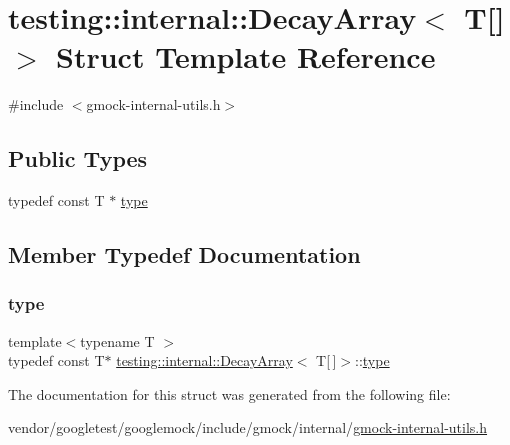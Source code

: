 \hypertarget{structtesting_1_1internal_1_1_decay_array_3_01_t[]_4}{}\section{testing\+:\+:internal\+:\+:Decay\+Array$<$ T\mbox{[}\mbox{]}$>$ Struct Template Reference}
\label{structtesting_1_1internal_1_1_decay_array_3_01_t[]_4}


{\ttfamily \#include $<$gmock-\/internal-\/utils.\+h$>$}

\subsection*{Public Types}
\begin{DoxyCompactItemize}
\item 
typedef const T $\ast$ \hyperlink{structtesting_1_1internal_1_1_decay_array_3_01_t[]_4_a1820b673d104b3a985faaef8db5d77d2}{type}
\end{DoxyCompactItemize}


\subsection{Member Typedef Documentation}
\mbox{\label{structtesting_1_1internal_1_1_decay_array_3_01_t[]_4_a1820b673d104b3a985faaef8db5d77d2}} 
\subsubsection{\texorpdfstring{type}{type}}
{\footnotesize\ttfamily template$<$typename T $>$ \\
typedef const T$\ast$ \hyperlink{structtesting_1_1internal_1_1_decay_array}{testing\+::internal\+::\+Decay\+Array}$<$ T\mbox{[}$\,$\mbox{]}$>$\+::\hyperlink{structtesting_1_1internal_1_1_decay_array_3_01_t[]_4_a1820b673d104b3a985faaef8db5d77d2}{type}}



The documentation for this struct was generated from the following file\+:\begin{DoxyCompactItemize}
\item 
vendor/googletest/googlemock/include/gmock/internal/\hyperlink{gmock-internal-utils_8h}{gmock-\/internal-\/utils.\+h}\end{DoxyCompactItemize}

